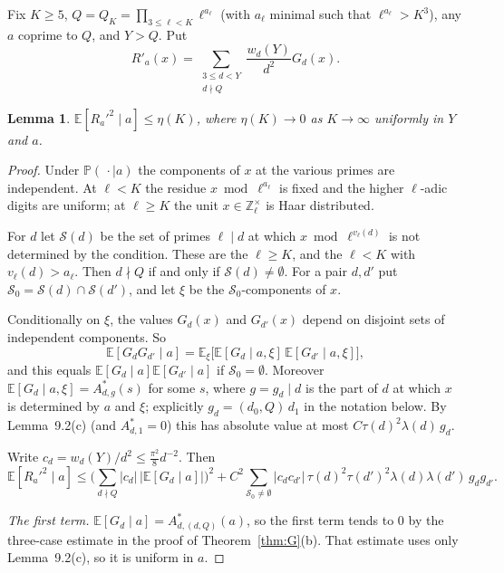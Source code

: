 \documentclass[11pt]{amsart}
\newtheorem{lemma}{Lemma}[section]
\theoremstyle{remark}
\newcommand{\E}{\mathbb{E}}
\newcommand{\Prob}{\mathbb{P}}
\newcommand{\Z}{\mathbb{Z}}
\begin{document}
Fix $K\ge5$, $Q=Q_K=\prod_{3\le\ell<K}\ell^{a_\ell}$ (with $a_\ell$ minimal such that $\ell^{a_\ell}>K^3$), any $a$ coprime to $Q$, and $Y>Q$. Put
\[
R'_a(x)=\sum_{\substack{3\le d<Y\\ d\nmid Q}}\frac{w_d(Y)}{d^2}G_d(x).
\]

\begin{lemma}\label{lem:R'}
$\E[R_a'^2\mid a]\le\eta(K)$, where $\eta(K)\to0$ as $K\to\infty$ uniformly in $Y$ and $a$.
\end{lemma}

\begin{proof}
Under $\Prob(\,\cdot\mid a)$ the components of $x$ at the various primes are independent. At $\ell<K$ the residue $x\bmod\ell^{a_\ell}$ is fixed and the higher $\ell$-adic digits are uniform; at $\ell\ge K$ the unit $x\in\Z_\ell^\times$ is Haar distributed.

For $d$ let $\mathcal S(d)$ be the set of primes $\ell\mid d$ at which $x\bmod\ell^{v_\ell(d)}$ is not determined by the condition. These are the $\ell\ge K$, and the $\ell<K$ with $v_\ell(d)>a_\ell$. Then $d\nmid Q$ if and only if $\mathcal S(d)\ne\emptyset$. For a pair $d,d'$ put $\mathcal S_0=\mathcal S(d)\cap\mathcal S(d')$, and let $\xi$ be the $\mathcal S_0$-components of $x$.

Conditionally on $\xi$, the values $G_d(x)$ and $G_{d'}(x)$ depend on disjoint sets of independent components. So
\[
\E[G_dG_{d'}\mid a]=\E_\xi\big[\E[G_d\mid a,\xi]\,\E[G_{d'}\mid a,\xi]\big],
\]
and this equals $\E[G_d\mid a]\E[G_{d'}\mid a]$ if $\mathcal S_0=\emptyset$. Moreover $\E[G_d\mid a,\xi]=A^*_{d,g}(s)$ for some $s$, where $g=g_d\mid d$ is the part of $d$ at which $x$ is determined by $a$ and $\xi$; explicitly $g_d=(d_0,Q)\,d_1$ in the notation below. By Lemma~9.2(c) (and $A^*_{d,1}=0$) this has absolute value at most $C\tau(d)^2\lambda(d)\,g_d$.

Write $c_d=w_d(Y)/d^2\le\frac{\pi^2}8d^{-2}$. Then
\[
\E[R_a'^2\mid a]\le\Big(\sum_{d\nmid Q}|c_d|\,|\E[G_d\mid a]|\Big)^2+C^2\!\!\sum_{\mathcal S_0\neq\emptyset}|c_dc_{d'}|\,\tau(d)^2\tau(d')^2\lambda(d)\lambda(d')\,g_dg_{d'} .
\]

\emph{The first term.} $\E[G_d\mid a]=A^*_{d,(d,Q)}(a)$, so the first term tends to $0$ by the three-case estimate in the proof of Theorem~\ref{thm:G}(b). That estimate uses only Lemma~9.2(c), so it is uniform in $a$.


\end{proof}
\end{document}
